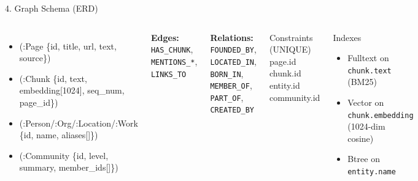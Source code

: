 \documentclass[aspectratio=169]{beamer}
\begin{document}
\begin{frame}[shrink=5]{4. Graph Schema (ERD)}
\begin{columns}[T]
{\ttfamily\scriptsize
\begin{itemize}\setlength\itemsep{2pt}
  \item (\textcolor{fptOrange}{:Page} \{id, title, url, text, source\})
  \item (\textcolor{fptOrange}{:Chunk} \{id, text, embedding[1024], seq\_num, page\_id\})
  \item (\textcolor{fptOrange}{:Person/:Org/:Location/:Work} \{id, name, aliases[]\})
  \item (\textcolor{fptOrange}{:Community} \{id, level, summary, member\_ids[]\})
\end{itemize}
}
\smallskip
{\scriptsize
\textbf{Edges:} \texttt{HAS\_CHUNK}, \texttt{MENTIONS\_*}, \texttt{LINKS\_TO}

\textbf{Relations:} \texttt{FOUNDED\_BY}, \texttt{LOCATED\_IN}, \texttt{BORN\_IN},
\texttt{MEMBER\_OF}, \texttt{PART\_OF}, \texttt{CREATED\_BY}
}

\begin{block}{Constraints (UNIQUE)}
{\scriptsize page.id \quad chunk.id \quad entity.id \quad community.id}
\end{block}
\begin{exampleblock}{Indexes}
{\scriptsize
\begin{itemize}\setlength\itemsep{1pt}
  \item Fulltext on \texttt{chunk.text} (BM25)
  \item Vector on \texttt{chunk.embedding} (1024-dim cosine)
  \item Btree on \texttt{entity.name}
\end{itemize}
}
\end{exampleblock}
\end{columns}
\end{frame}
\end{document}
